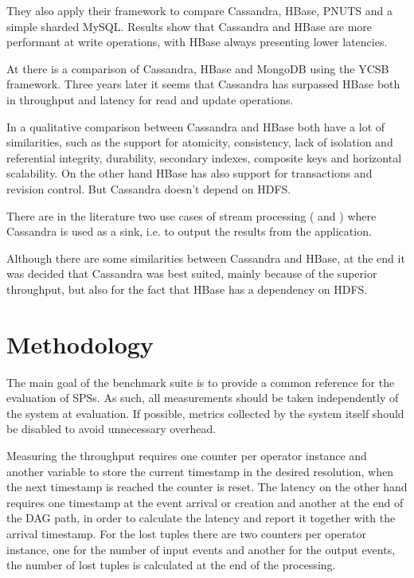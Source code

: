 \documentclass[ppgc,diss,english]{iiufrgs}
\begin{document}
They also apply their framework to compare Cassandra, HBase, PNUTS and a simple sharded MySQL. Results show that Cassandra and HBase are more performant at write operations, with HBase always presenting lower latencies. 

At \cite{Datastax:2013} there is a comparison of Cassandra, HBase and MongoDB using the YCSB framework. Three years later it seems that Cassandra has surpassed HBase both in throughput and latency for read and update operations.

In a qualitative comparison between Cassandra and HBase \cite{moniruzzaman2013nosql} both have a lot of similarities, such as the support for atomicity, consistency, lack of isolation and referential integrity, durability, secondary indexes, composite keys and horizontal scalability. On the other hand HBase has also support for transactions and revision control. But Cassandra doesn't depend on HDFS.

There are in the literature two use cases of stream processing (\cite{wang2013cluster} and \cite{chardonnens2013big}) where Cassandra is used as a sink, i.e. to output the results from the application.

Although there are some similarities between Cassandra and HBase, at the end it was decided that Cassandra was best suited, mainly because of the superior throughput, but also for the fact that HBase has a dependency on HDFS.


\section{Methodology}
\label{sec:methodology}

%
%
%

The main goal of the benchmark suite is to provide a common reference for the evaluation of SPSs. As such, all measurements should be taken independently of the system at evaluation. If possible, metrics collected by the system itself should be disabled to avoid unnecessary overhead.

Measuring the throughput requires one counter per operator instance and another variable to store the current timestamp in the desired resolution, when the next timestamp is reached the counter is reset. The latency on the other hand requires one timestamp at the event arrival or creation and another at the end of the DAG path, in order to calculate the latency and report it together with the arrival timestamp. For the lost tuples there are two counters per operator instance, one for the number of input events and another for the output events, the number of lost tuples is calculated at the end of the processing.
\end{document}
